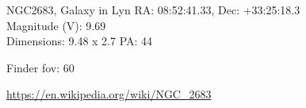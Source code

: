 \begin{block}{NGC2683, Galaxy in Lyn}
    RA: 08:52:41.33, Dec: +33:25:18.3 \\ 
    Magnitude (V): 9.69 \\ 
    Dimensions: 9.48 x 2.7 PA: 44 

    Finder fov: 60 

    \url{https://en.wikipedia.org/wiki/NGC_2683} 
\end{block}